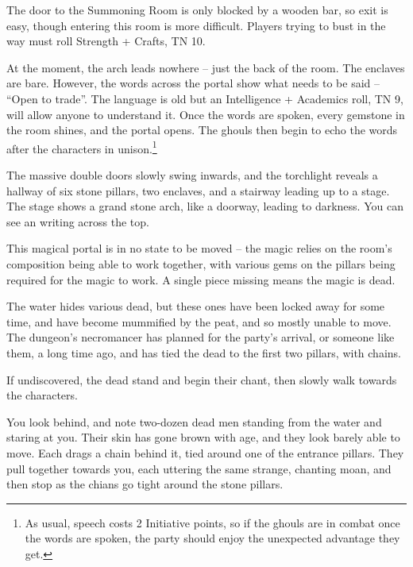 \begin{multicols}{2}
The door to the Summoning Room is only blocked by a wooden bar, so exit is easy, though entering this room is more difficult.
Players trying to bust in the way must roll Strength + Crafts, TN 10.


At the moment, the arch leads nowhere  -- just the back of the room.  The enclaves are bare.
However, the words across the portal show what needs to be said -- ``Open to trade''.
The language is old but an Intelligence + Academics roll, TN 9, will allow anyone to understand it.
Once the words are spoken, every gemstone in the room shines, and the portal opens.
The ghouls then begin to echo the words after the characters in unison.\footnote{As usual, speech costs 2 Initiative points, so if the ghouls are in combat once the words are spoken, the party should enjoy the unexpected advantage they get.}

\begin{boxtext}

	The massive double doors slowly swing inwards, and the torchlight reveals a hallway of six stone pillars, two enclaves, and a stairway leading up to a stage.  The stage shows a grand stone arch, like a doorway, leading to darkness.
	You can see an writing across the top.

\end{boxtext}

This magical portal is in no state to be moved -- the magic relies on the room's composition being able to work together, with various gems on the pillars being required for the magic to work.
A single piece missing means the magic is dead.

The water hides various dead, but these ones have been locked away for some time, and have become mummified by the peat, and so mostly unable to move.  The dungeon's necromancer has planned for the party's arrival, or someone like them, a long time ago, and has tied the dead to the first two pillars, with chains.

If undiscovered, the dead stand and begin their chant, then slowly walk towards the characters.

\begin{boxtext}
	You look behind, and note two-dozen dead men standing from the water and staring at you.  Their skin has gone brown with age, and they look barely able to move.  Each drags a chain behind it, tied around one of the entrance pillars.  They pull together towards you, each uttering the same strange, chanting moan, and then stop as the chians go tight around the stone pillars.
\end{boxtext}


\end{multicols}
